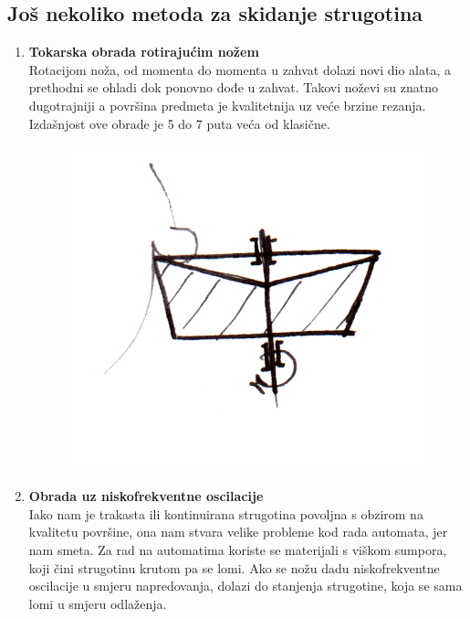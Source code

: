 \documentclass[a4paper,12pt]{article}
\numberwithin{figure}{section}
\begin{document}
\subsection{Još nekoliko metoda za skidanje strugotina}
\begin{enumerate}
\item \textbf{Tokarska obrada rotirajućim nožem} \\
Rotacijom noža, od momenta do momenta u zahvat dolazi novi dio alata, a prethodni se ohladi dok ponovno dođe u zahvat. Takovi noževi su znatno dugotrajniji a površina predmeta je kvalitetnija uz veće brzine rezanja. Izdašnjost ove obrade je 5 do 7 puta veća od klasične.
\begin{figure}[!h]
\centering
\includegraphics[scale=0.15]{image_64-1.png}
\end{figure}
\FloatBarrier
\item \textbf{Obrada uz niskofrekventne oscilacije} \\
Iako nam je trakasta ili kontinuirana strugotina povoljna s obzirom  na kvalitetu površine, ona nam stvara velike probleme kod rada automata, jer nam smeta. Za rad na automatima koriste se materijali s viškom sumpora, koji čini strugotinu krutom pa se lomi. Ako se nožu dadu niskofrekventne oscilacije u smjeru napredovanja, dolazi do stanjenja strugotine, koja se sama lomi u smjeru odlaženja.
\begin{figure}[!h]
\centering

\end{figure}
\end{enumerate}
\end{document}
